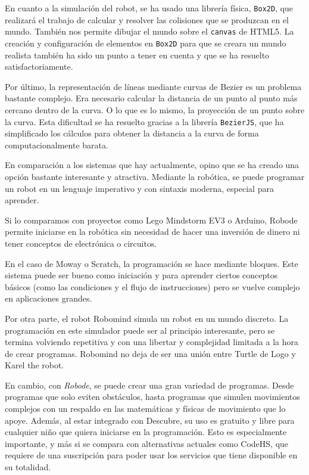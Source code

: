 
En cuanto a la simulación del robot, se ha usado una librería física, \texttt{Box2D}, que realizará el trabajo de calcular y resolver las colisiones que se produzcan en el mundo. También nos permite dibujar el mundo sobre el \texttt{canvas} de HTML5. La creación y configuración de elementos en \texttt{Box2D} para que se creara un mundo realista también ha sido un punto a tener en cuenta y que se ha resuelto satisfactoriamente. 

Por último, la representación de líneas mediante curvas de Bezier es un problema bastante complejo. Era necesario calcular la distancia de un punto al punto más cercano dentro de la curva. O lo que es lo mismo, la proyección de un punto sobre la curva. Esta dificultad se ha resuelto gracias a la librería \texttt{BezierJS}, que ha simplificado los cálculos para obtener la distancia a la curva de forma computacionalmente barata. 


En comparación a los sistemas que hay actualmente, opino que se ha creado una opción bastante interesante y atractiva. Mediante la robótica, se puede programar un robot en un lenguaje imperativo y con sintaxis moderna, especial para aprender. 

Si lo comparamos con proyectos como Lego Mindstorm EV3 o Arduino, Robode permite iniciarse en la robótica sin necesidad de hacer una inversión de dinero ni tener conceptos de electrónica o circuitos.

En el caso de Moway o Scratch, la programación se hace mediante bloques. Este sistema puede ser bueno como iniciación y para aprender ciertos conceptos básicos (como las condiciones y el flujo de instrucciones) pero se vuelve complejo en aplicaciones grandes. 

Por otra parte, el robot Robomind simula un robot en un mundo discreto. La programación en este simulador puede ser al principio interesante, pero se termina volviendo repetitiva y con una libertar y complejidad limitada a la hora de crear programas. Robomind no deja de ser una unión entre Turtle de Logo y Karel the robot. 

En cambio, con \emph{Robode}, se puede crear una gran variedad de programas. Desde programas que solo eviten obstáculos, hasta programas que simulen movimientos complejos con un respaldo en las matemáticas y físicas de movimiento que lo apoye. Además, al estar integrado con Descubre, su uso es gratuito y libre para cualquier niño que quiera iniciarse en la programación. Esto es especialmente importante, y más si se compara con alternativas actuales como CodeHS, que requiere de una suscripción para poder usar los servicios que tiene disponible en su totalidad.



